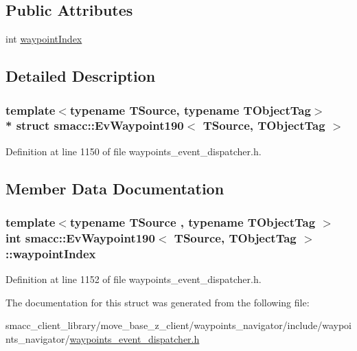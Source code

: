 \subsection*{Public Attributes}
\begin{DoxyCompactItemize}
\item 
int \hyperlink{structsmacc_1_1EvWaypoint190_aa6ced882660f3c18f5b80cf30fdf70cb}{waypoint\+Index}
\end{DoxyCompactItemize}


\subsection{Detailed Description}
\subsubsection*{template$<$typename T\+Source, typename T\+Object\+Tag$>$\\*
struct smacc\+::\+Ev\+Waypoint190$<$ T\+Source, T\+Object\+Tag $>$}



Definition at line 1150 of file waypoints\+\_\+event\+\_\+dispatcher.\+h.



\subsection{Member Data Documentation}
\subsubsection[{\texorpdfstring{waypoint\+Index}{waypointIndex}}]{\setlength{\rightskip}{0pt plus 5cm}template$<$typename T\+Source , typename T\+Object\+Tag $>$ int {\bf smacc\+::\+Ev\+Waypoint190}$<$ T\+Source, T\+Object\+Tag $>$\+::waypoint\+Index}\hypertarget{structsmacc_1_1EvWaypoint190_aa6ced882660f3c18f5b80cf30fdf70cb}{}\label{structsmacc_1_1EvWaypoint190_aa6ced882660f3c18f5b80cf30fdf70cb}


Definition at line 1152 of file waypoints\+\_\+event\+\_\+dispatcher.\+h.



The documentation for this struct was generated from the following file\+:\begin{DoxyCompactItemize}
\item 
smacc\+\_\+client\+\_\+library/move\+\_\+base\+\_\+z\+\_\+client/waypoints\+\_\+navigator/include/waypoints\+\_\+navigator/\hyperlink{waypoints__event__dispatcher_8h}{waypoints\+\_\+event\+\_\+dispatcher.\+h}\end{DoxyCompactItemize}

